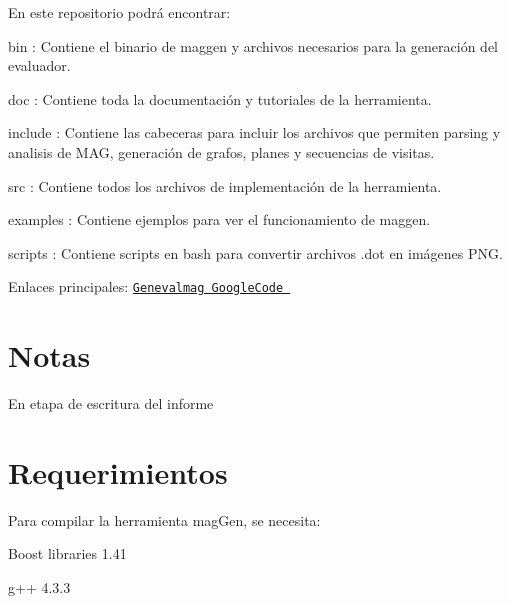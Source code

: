 En este repositorio podrá encontrar:\par

\begin{DoxyItemize}
\item bin : Contiene el binario de maggen y archivos necesarios para la generación del evaluador.
\item doc : Contiene toda la documentación y tutoriales de la herramienta.
\item include : Contiene las cabeceras para incluir los archivos que permiten parsing y analisis de MAG, generación de grafos, planes y secuencias de visitas.
\item src : Contiene todos los archivos de implementación de la herramienta.
\item examples : Contiene ejemplos para ver el funcionamiento de maggen.
\item scripts : Contiene scripts en bash para convertir archivos .dot en imágenes PNG.
\end{DoxyItemize}

Enlaces principales: \href{http://code.google.com/p/genevalmag/}{\tt Genevalmag GoogleCode }\hypertarget{index_notes}{}\section{Notas}\label{index_notes}
En etapa de escritura del informe\hypertarget{index_requirements}{}\section{Requerimientos}\label{index_requirements}
Para compilar la herramienta magGen, se necesita:
\begin{DoxyItemize}
\item Boost libraries 1.41
\item g++ 4.3.3
\end{DoxyItemize}

\par
\par
 